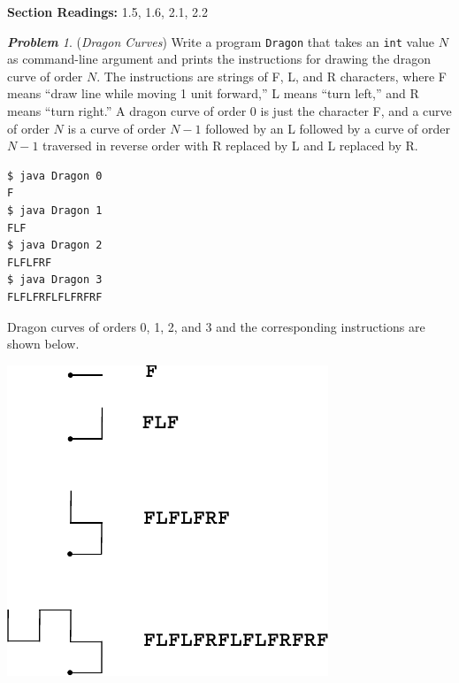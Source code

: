 \documentclass[a4paper, 12pt]{article}
\newcommand{\tbf}{\textbf}
\newcommand{\tit}{\textit}
\theoremstyle{remark}
\newtheorem{problem}{\normalfont \bfseries Problem}
\begin{document}
\noindent \tbf{Section Readings:} 1.5, 1.6, 2.1, 2.2

\bigskip

\begin{problem}
(\tit{Dragon Curves}) Write a program \lstinline$Dragon$ that takes an \lstinline$int$ value $N$ as command-line argument and prints the instructions for drawing the dragon curve of order $N$. The instructions are strings of F, L, and R characters, where F means ``draw line while moving 1 unit forward,'' L means ``turn left,''
and R means ``turn right.'' A dragon curve of order 0 is just the character F, and a curve of order $N$ is a curve of order $N-1$ followed by an L followed by a curve of order $N-1$ traversed in reverse order with R replaced by L and L replaced by R. 

\begin{lstlisting}[language=bash]
$ java Dragon 0
F
$ java Dragon 1
FLF
$ java Dragon 2
FLFLFRF
$ java Dragon 3
FLFLFRFLFLFRFRF
\end{lstlisting}
Dragon curves of orders 0, 1, 2, and 3 and the corresponding instructions are shown below.

\begin{center}
\includegraphics[scale=0.7]{dragon.pdf}
\end{center}
\end{problem}
\end{document}
